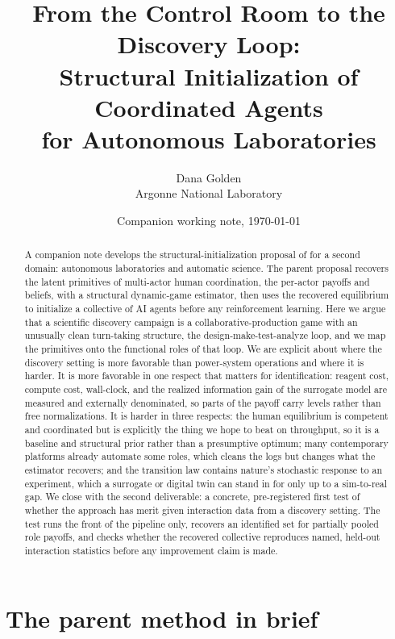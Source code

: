 \documentclass[11pt]{article}
\title{From the Control Room to the Discovery Loop:\\
Structural Initialization of Coordinated Agents\\ for Autonomous Laboratories}
\author{Dana Golden\\[2pt] \small Argonne National Laboratory}
\date{Companion working note, \today}
\theoremstyle{definition}
\begin{document}
\maketitle

\begin{abstract}
\noindent A companion note develops the structural-initialization proposal of \citet{golden2026struct} for a second domain: autonomous laboratories and automatic science. The parent proposal recovers the latent primitives of multi-actor human coordination, the per-actor payoffs and beliefs, with a structural dynamic-game estimator, then uses the recovered equilibrium to initialize a collective of AI agents before any reinforcement learning. Here we argue that a scientific discovery campaign is a collaborative-production game with an unusually clean turn-taking structure, the design-make-test-analyze loop, and we map the primitives onto the functional roles of that loop. We are explicit about where the discovery setting is more favorable than power-system operations and where it is harder. It is more favorable in one respect that matters for identification: reagent cost, compute cost, wall-clock, and the realized information gain of the surrogate model are measured and externally denominated, so parts of the payoff carry levels rather than free normalizations. It is harder in three respects: the human equilibrium is competent and coordinated but is explicitly the thing we hope to beat on throughput, so it is a baseline and structural prior rather than a presumptive optimum; many contemporary platforms already automate some roles, which cleans the logs but changes what the estimator recovers; and the transition law contains nature's stochastic response to an experiment, which a surrogate or digital twin can stand in for only up to a sim-to-real gap. We close with the second deliverable: a concrete, pre-registered first test of whether the approach has merit given interaction data from a discovery setting. The test runs the front of the pipeline only, recovers an identified set for partially pooled role payoffs, and checks whether the recovered collective reproduces named, held-out interaction statistics before any improvement claim is made.
\end{abstract}

\section{The parent method in brief}
\end{document}
